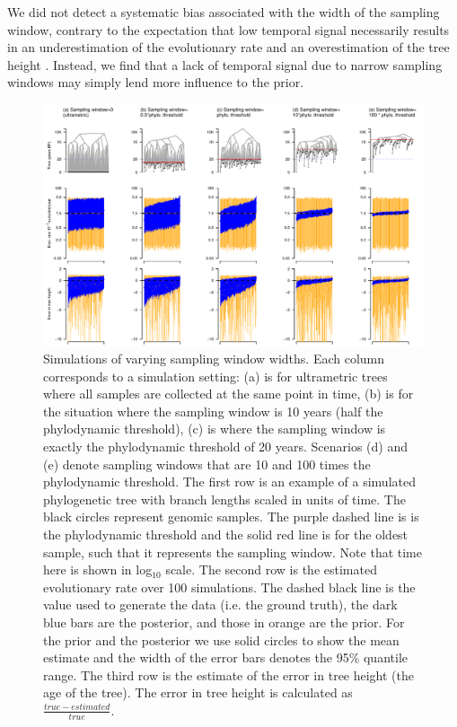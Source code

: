 \documentclass[11pt]{article}
\begin{document}
We did not detect a systematic bias associated with the width of the sampling window, contrary to the expectation that low temporal signal necessarily results in an underestimation of the evolutionary rate and an overestimation of the tree height \citep{duchene2015performance}. Instead, we find that a lack of temporal signal due to narrow sampling windows may simply lend more influence to the prior. 

\begin{landscape}
	\begin{figure}[H]
		\begin{center}
			\includegraphics[scale=0.7, angle=0]{summary_all_estimates_correct_prior.pdf}
			\caption{Simulations of varying sampling window widths. Each column corresponds to a simulation setting: (a) is for ultrametric trees where all samples are collected at the same point in time, (b) is for the situation where the sampling window is 10 years (half the phylodynamic threshold), (c) is where the sampling window is exactly the phylodynamic threshold of 20 years. Scenarios (d) and (e) denote sampling windows that are 10 and 100 times the phylodynamic threshold. The first row is an example of a simulated phylogenetic tree with branch lengths scaled in units of time. The black circles represent genomic samples. The purple dashed line is is the phylodynamic threshold and the solid red line is for the oldest sample, such that it represents the sampling window. Note that time here is shown in log$_{10}$ scale. The second row is the estimated evolutionary rate over 100 simulations. The dashed black line is the value used to generate the data (i.e. the ground truth), the dark blue bars are the posterior, and those in orange are the prior. For the prior and the posterior we use solid circles to show the mean estimate and the width of the error bars denotes the 95\% quantile range. The third row is the estimate of the error in tree height (the age of the tree). The error in tree height is calculated as $\frac{true-estimated}{true}$.}
			\label{figure:Fig2}
		\end{center}
	\end{figure}
\end{landscape}
\end{document}
